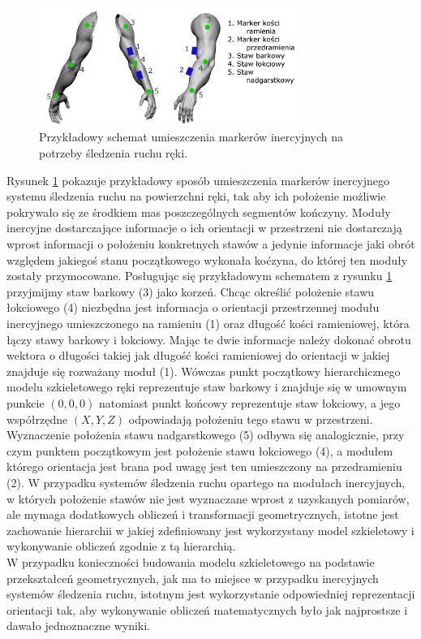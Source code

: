 \begin{figure}[!htp]
	\centering	
	\includegraphics[width=0.75\textwidth]{images/imuArm.png}
	\caption{Przykładowy schemat umieszczenia markerów inercyjnych na potrzeby śledzenia ruchu ręki.}
	\label{fig:literature:imuMarkerPlacementSample}
\end{figure}
		
Rysunek \ref{fig:literature:imuMarkerPlacementSample} pokazuje przykładowy sposób umieszczenia markerów inercyjnego systemu śledzenia ruchu na powierzchni ręki, tak aby ich położenie możliwie pokrywało się ze środkiem mas poszczególnych segmentów kończyny. 
Moduły inercyjne dostarczające informacje o ich orientacji w przestrzeni 
nie dostarczają wprost informacji o położeniu konkretnych stawów a jedynie informacje jaki obrót względem jakiegoś stanu początkowego wykonała koćzyna, do której ten moduły zostały przymocowane. Posługując się przykładowym schematem z rysunku \ref{fig:literature:imuMarkerPlacementSample} przyjmijmy staw barkowy (3) jako korzeń. Chcąc określić położenie stawu łokciowego (4) niezbędna jest informacja o orientacji przestrzennej modułu inercyjnego umieszczonego na ramieniu (1) oraz długość kości ramieniowej, która łączy stawy barkowy i łokciowy. Mając te dwie informacje należy dokonać obrotu wektora o długości takiej jak długość kości ramieniowej do orientacji w jakiej znajduje się rozważany moduł (1). Wówczas punkt początkowy hierarchicznego modelu szkieletowego ręki
reprezentuje staw barkowy i znajduje się w umownym punkcie $(0 , 0 , 0)$ natomiast punkt końcowy reprezentuje staw łokciowy, a jego współrzędne $(X , Y , Z)$ odpowiadają położeniu tego stawu w przestrzeni. Wyznaczenie położenia stawu nadgarstkowego (5) odbywa się analogicznie, przy czym punktem początkowym jest położenie stawu łokciowego (4), a modułem którego orientacja jest brana pod uwagę jest ten umieszczony na przedramieniu (2). W przypadku systemów śledzenia ruchu opartego na modułach inercyjnych, w których położenie stawów nie jest wyznaczane wprost z uzyskanych pomiarów, ale mymaga dodatkowych obliczeń i transformacji geometrycznych, istotne jest zachowanie hierarchii w jakiej zdefiniowany jest wykorzystany model szkieletowy i wykonywanie obliczeń zgodnie z tą hierarchią.\\
W przypadku konieczności budowania modelu szkieletowego na podstawie przekształceń geometrycznych, jak ma to miejsce w przypadku inercyjnych systemów śledzenia ruchu, istotnym jest wykorzystanie odpowiedniej reprezentacji orientacji tak, aby wykonywanie obliczeń matematycznych było jak najprostsze i dawało jednoznaczne wyniki.
		
